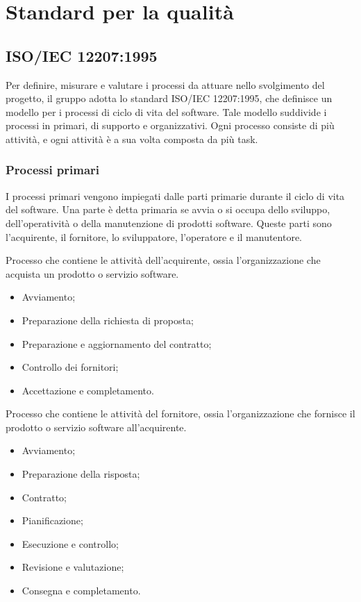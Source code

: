 \section{Standard per la qualità}

\subsection{ISO/IEC 12207:1995}
Per definire, misurare e valutare i processi da attuare nello svolgimento
del progetto, il gruppo adotta lo standard ISO/IEC 12207:1995, che
definisce un modello per i processi di ciclo di vita del software. 
Tale modello suddivide i processi in primari, di supporto e organizzativi.
Ogni processo consiste di più attività, e ogni attività è a sua volta
composta da più task.

\subsubsection{Processi primari}
I processi primari vengono impiegati dalle parti primarie durante il ciclo di 
vita del software. Una parte è detta primaria se avvia o si occupa dello 
sviluppo, dell'operatività o della manutenzione di prodotti software. 
Queste parti sono l'acquirente, il fornitore, lo sviluppatore, l'operatore e il manutentore.

Processo che contiene le attività dell'acquirente, ossia l'organizzazione che
acquista un prodotto o servizio software.
\begin{itemize}
    \item Avviamento;
    \item Preparazione della richiesta di proposta;
    \item Preparazione e aggiornamento del contratto;
    \item Controllo dei fornitori;
    \item Accettazione e completamento.
\end{itemize}

Processo che contiene le attività del fornitore, ossia l'organizzazione che
fornisce il prodotto o servizio software all'acquirente.
\begin{itemize}
    \item Avviamento;
    \item Preparazione della risposta;
    \item Contratto;
    \item Pianificazione;
    \item Esecuzione e controllo;
    \item Revisione e valutazione;
    \item Consegna e completamento.
\end{itemize}

